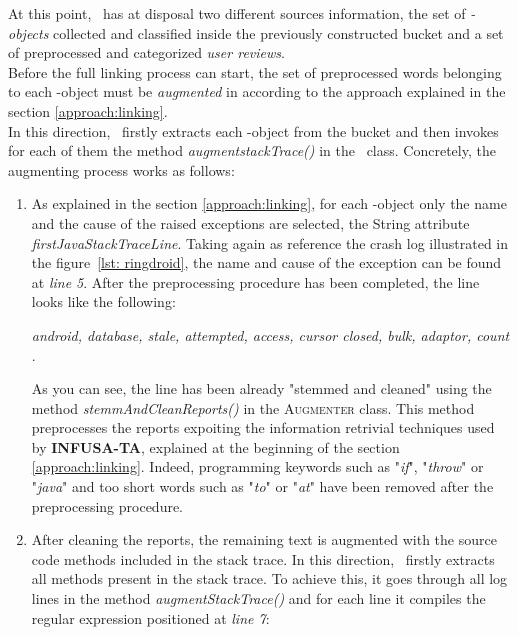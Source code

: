 At this point, \toolname\ has at disposal two different sources information, \ie the set of \textit{\Crash-objects }collected and classified inside the previously constructed bucket and a set of preprocessed and categorized \textit{user reviews}. \\
Before the full linking process can start, the set of preprocessed words belonging to each \Crash-object must be \textit{augmented} in according to the approach explained in the section \ref{approach:linking}. \\
In this direction, \toolname\ firstly extracts each \Crash-object from the bucket and then invokes for each of them the method 
\textit{augmentstackTrace()} in the \Crash\ class. 
Concretely, the augmenting process works as follows: 
\begin{enumerate}
\item As explained in the section \ref{approach:linking}, for each \Crash-object only the name and the cause of the raised exceptions are selected, \ie the String attribute \textit{firstJavaStackTraceLine}. Taking again as reference the crash log illustrated in the figure~\ref{lst: ringdroid}, the name and cause of the exception can be found at \textit{line 5}. 
After the preprocessing procedure has been completed, the line looks like the following: 
\begin{center}
\smallbreak
\emph{\small android, database, stale, attempted, access, cursor closed, bulk, adaptor, count }. 
\end{center} 
As you can see, the line has been already "stemmed and cleaned" using the method \textit{stemmAndCleanReports()} in the \textsc{Augmenter} class. 
This method preprocesses the reports expoiting the information retrivial techniques used by \textbf{INFUSA-TA}, explained at the beginning of the section \ref{approach:linking}.
Indeed, programming keywords such as "\textit{if}", "\textit{throw}" or "\textit{java}" and too short words such as "\textit{to}" or "\textit{at}" have been removed after the preprocessing procedure. 
\item After cleaning the reports, the remaining text is augmented with the source code methods included in the stack trace. In this direction, \toolname\ firstly extracts all methods present in the stack trace. To achieve this, it goes through all log lines in the method \textit{augmentStackTrace()} and for each line it compiles the regular expression positioned at \textit{line 7}: 
\begin{lstlisting}[caption=Regular expression for extracting all methods from a stack trace,label={lst: augmentstack}]

\end{lstlisting}
\end{enumerate}
